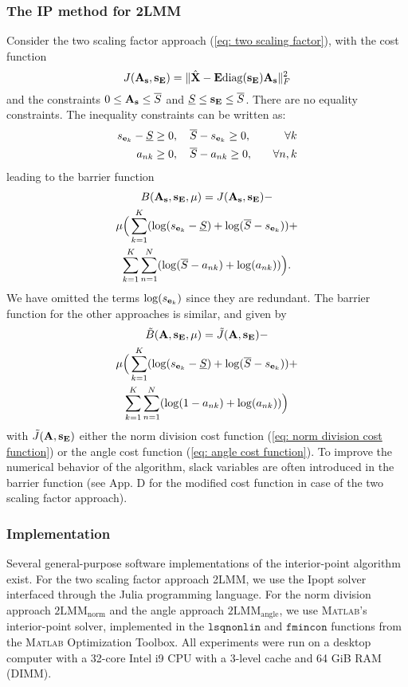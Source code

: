 \subsubsection{The IP method for 2LMM}
Consider the two scaling factor approach (\ref{eq: two scaling factor}), with the cost function
\[
J(\mathbf{A}_{\mathbf{s}}, \mathbf{s}_{\mathbf{E}}) = \|\hat{\mathbf{X}} - \mathbf{E} \mathrm{diag}(\mathbf{s}_{\mathbf{E}})\mathbf{A}_{\mathbf{s}}\|_F^2
\]
and the constraints $0 \leq \mathbf{A}_{\mathbf{s}} \leq \overline{S}$ and $\underline{S} \leq \mathbf{s}_{\mathbf{E}} \leq \overline{S}$. There are no equality constraints. The inequality constraints can be written as:
\begin{equation}
    \begin{aligned}
    s_{\mathbf{e}_k} - \underline{S} & \geq 0, \quad \overline{S} - s_{\mathbf{e}_k} \geq 0, & \quad \forall k  \\
    a_{nk} & \geq 0, \quad  \overline{S} - a_{nk} \geq 0, & \quad \forall n, k
    \end{aligned}
\end{equation}
leading to the barrier function
\begin{multline*}
    B(\mathbf{A}_{\mathbf{s}}, \mathbf{s}_{\mathbf{E}}, \mu) = J(\mathbf{A}_{\mathbf{s}}, \mathbf{s}_{\mathbf{E}}) -   \\
    \mu \Big(\sum_{k=1}^K (\log (s_{\mathbf{e}_k} - \underline{S}) + \log (\overline{S} - s_{\mathbf{e}_k})) + \\
    \sum_{k=1}^K \sum_{n=1}^N (\log (\overline{S} - a_{nk}) + \log (a_{nk}))\Big).
\end{multline*}
We have omitted the terms $\log (s_{\mathbf{e}_k})$ since they are redundant. The barrier function for the other approaches is similar, and given by
\begin{multline*}
    \Tilde{B}(\mathbf{A}, \mathbf{s}_{\mathbf{E}}, \mu) = \Tilde{J}(\mathbf{A}, \mathbf{s}_{\mathbf{E}}) -   \\
    \mu \Big(\sum_{k=1}^K (\log (s_{\mathbf{e}_k} - \underline{S}) + \log (\overline{S} - s_{\mathbf{e}_k})) + \\
    \sum_{k=1}^K \sum_{n=1}^N (\log (1 - a_{nk}) + \log (a_{nk}))\Big)
\end{multline*}
with $\Tilde{J}(\mathbf{A}, \mathbf{s}_{\mathbf{E}})$ either the norm division cost function (\ref{eq: norm division cost function}) or the angle cost function (\ref{eq: angle cost function}). To improve the numerical behavior of the algorithm, slack variables are often introduced in the barrier function (see App. D for the modified cost function in case of the two scaling factor approach). 

\subsubsection{Implementation}
Several general-purpose software implementations of the interior-point algorithm exist. For the two scaling factor approach 2LMM, we use the Ipopt solver \cite{wachter_line_2005} interfaced through the Julia programming language. For the norm division approach $\mathrm{2LMM}_\mathrm{norm}$ and the angle approach $\mathrm{2LMM}_\mathrm{angle}$, we use \textsc{Matlab}'s interior-point solver, implemented in the $\texttt{lsqnonlin}$ and $\texttt{fmincon}$ functions from the \textsc{Matlab} Optimization Toolbox. All experiments were run on a desktop computer with a 32-core Intel i9 CPU with a 3-level cache and 64 GiB RAM (DIMM).